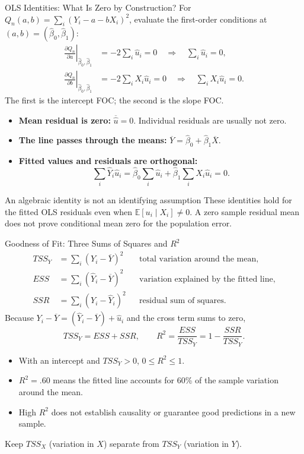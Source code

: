 \documentclass[10pt,aspectratio=169]{beamer}
\newcommand{\E}{\mathbb{E}}
\begin{document}
\begin{frame}{OLS Identities: What Is Zero by Construction?}
\small
For $Q_n(a,b)=\sum_i(Y_i-a-bX_i)^2$, evaluate the first-order conditions at $(a,b)=(\widehat\beta_0,\widehat\beta_1)$:
\begin{align*}
\left.\frac{\partial Q_n}{\partial a}\right|_{\widehat\beta_0,\widehat\beta_1} &=-2\sum_i\widehat u_i=0 \quad\Longrightarrow\quad \sum_i\widehat u_i=0,\\
\left.\frac{\partial Q_n}{\partial b}\right|_{\widehat\beta_0,\widehat\beta_1} &=-2\sum_iX_i\widehat u_i=0 \quad\Longrightarrow\quad \sum_iX_i\widehat u_i=0.
\end{align*}
The first is the intercept FOC; the second is the slope FOC.
\begin{itemize}
\item \textbf{Mean residual is zero:} $\overline{\widehat u}=0$. Individual residuals are usually not zero.
\item \textbf{The line passes through the means:}
$\overline Y=\widehat\beta_0+\widehat\beta_1\overline X$.
\item \textbf{Fitted values and residuals are orthogonal:}
\[
\sum_i\widehat Y_i\widehat u_i
=\widehat\beta_0\sum_i\widehat u_i+
\widehat\beta_1\sum_iX_i\widehat u_i=0.
\]
\end{itemize}
\begin{block}{An algebraic identity is not an identifying assumption}
These identities hold for the fitted OLS residuals even when $\E[u_i\mid X_i]\neq0$.
A zero sample residual mean does not prove conditional mean zero for the population error.
\end{block}
\end{frame}

\begin{frame}{Goodness of Fit: Three Sums of Squares and $R^2$}
\small
\begin{align*}
TSS_Y&=\sum_i(Y_i-\overline Y)^2 &&\text{total variation around the mean},\\
ESS&=\sum_i(\widehat Y_i-\overline Y)^2 &&\text{variation explained by the fitted line},\\
SSR&=\sum_i(Y_i-\widehat Y_i)^2 &&\text{residual sum of squares}.
\end{align*}
Because $Y_i-\overline Y=(\widehat Y_i-\overline Y)+\widehat u_i$ and the cross term sums to zero,
\[
TSS_Y=ESS+SSR,\qquad
\boxed{R^2=\frac{ESS}{TSS_Y}=1-\frac{SSR}{TSS_Y}}.
\]
\begin{itemize}
\item With an intercept and $TSS_Y>0$, $0\leq R^2\leq1$.
\item $R^2=.60$ means the fitted line accounts for 60\% of the sample variation around the mean.
\item High $R^2$ does not establish causality or guarantee good predictions in a new sample.
\end{itemize}
Keep $TSS_X$ (variation in $X$) separate from $TSS_Y$ (variation in $Y$).
\end{frame}
\end{document}
